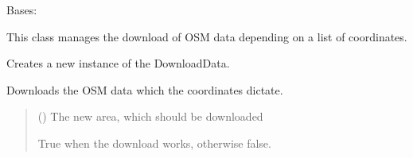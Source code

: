 \documentclass[letterpaper,10pt,english]{sphinxmanual}
\begin{document}
\begin{fulllineitems}
\label{\detokenize{apidoc/src.osm_configurator.model.project.configuration:src.osm_configurator.model.project.configuration.download_data.DownloadData}}
\pysigstartsignatures
{}
\pysigstopsignatures
\sphinxAtStartPar
Bases: 

\sphinxAtStartPar
This class manages the download of OSM data depending on a list of coordinates.

\begin{fulllineitems}
\label{\detokenize{apidoc/src.osm_configurator.model.project.configuration:src.osm_configurator.model.project.configuration.download_data.DownloadData.__init__}}
\pysigstartsignatures
{}
\pysigstopsignatures
\sphinxAtStartPar
Creates a new instance of the DownloadData.

\end{fulllineitems}


\begin{fulllineitems}
\label{\detokenize{apidoc/src.osm_configurator.model.project.configuration:src.osm_configurator.model.project.configuration.download_data.DownloadData.download_data}}
\pysigstartsignatures
{}
\pysigstopsignatures
\sphinxAtStartPar
Downloads the OSM data which the coordinates dictate.
\begin{quote}\begin{description}
\sphinxAtStartPar
{} () \textendash{} The new area, which should be downloaded

\sphinxAtStartPar
True when the download works, otherwise false.

\sphinxAtStartPar
{}

\end{description}\end{quote}

\end{fulllineitems}


\end{fulllineitems}
\end{document}
